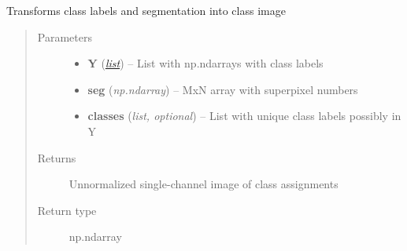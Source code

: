 \documentclass[letterpaper,10pt,english]{sphinxmanual}
\begin{document}
\begin{fulllineitems}
\label{classification:flamingo.classification.utils.labels2image}
Transforms class labels and segmentation into class image
\begin{quote}\begin{description}
\item[{Parameters}] \leavevmode\begin{itemize}
\item {} 
\textbf{Y} (\href{http://docs.python.org/library/functions.html\#list}{\emph{list}}) -- List with np.ndarrays with class labels

\item {} 
\textbf{seg} (\emph{np.ndarray}) -- MxN array with superpixel numbers

\item {} 
\textbf{classes} (\emph{list, optional}) -- List with unique class labels possibly in Y

\end{itemize}

\item[{Returns}] \leavevmode
Unnormalized single-channel image of class assignments

\item[{Return type}] \leavevmode
np.ndarray

\end{description}\end{quote}

\end{fulllineitems}

\end{document}
